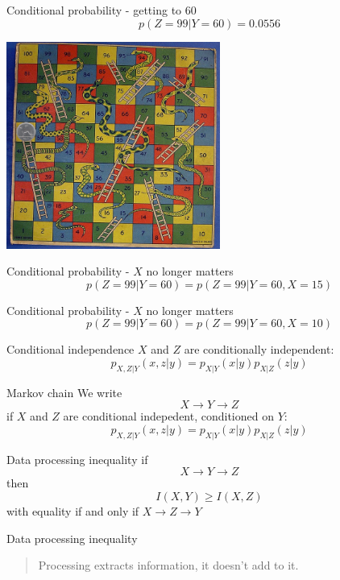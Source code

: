 \documentclass{beamer}
\newcommand{\crish}{\color{reddish}}
\newcommand{\cbla}{\color{black}}
\begin{document}
\begin{frame}{Conditional probability - getting to 60}
    \crish $$ p(Z=99|Y=60)=0.0556 $$ \cbla
  \begin{center}
    \includegraphics[width=7cm]{game60.jpg}
  \end{center}
\end{frame}

\begin{frame}{Conditional probability - \crish$X$\cbla{} no longer matters}
    \crish $$ p(Z=99|Y=60)=p(Z=99|Y=60,X=15) $$ \cbla
\end{frame}


\begin{frame}{Conditional probability - \crish$X$\cbla{} no longer matters}
    \crish $$ p(Z=99|Y=60)=p(Z=99|Y=60,X=10) $$ \cbla
\end{frame}


\begin{frame}{Conditional independence}
\crish$X$\cbla{} and \crish$Z$\cbla{} are conditionally independent:
\crish
$$
p_{X,Z|Y}(x,z|y)=p_{X|Y}(x|y)p_{X|Z}(z|y)
$$
\cbla
\end{frame}


\begin{frame}{Markov chain}
  We write
 \crish
 $$X\rightarrow Y\rightarrow Z$$
 \cbla
 if \crish$X$\cbla{} and \crish$Z$\cbla{} are conditional indepedent, conditioned on \crish$Y$\cbla{}:
 \crish
$$
p_{X,Z|Y}(x,z|y)=p_{X|Y}(x|y)p_{X|Z}(z|y)
$$
\cbla
\end{frame}


\begin{frame}{Data processing inequality}
 if
 \crish
 $$X\rightarrow Y\rightarrow Z$$
 \cbla
then
 \crish
$$
I(X,Y)\ge I(X,Z)
$$
\cbla
with equality if and only if  \crish$X\rightarrow Z\rightarrow Y$\cbla
\end{frame}

\begin{frame}{Data processing inequality}
  \begin{quote}
    Processing extracts information, it doesn't add to it.
  \end{quote}
  \end{frame}
\end{document}
